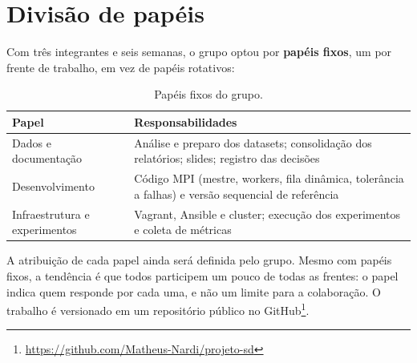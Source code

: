 \section{Divisão de papéis}

Com três integrantes e seis semanas, o grupo optou por \textbf{papéis
fixos}, um por frente de trabalho, em vez de papéis rotativos:

\begin{table}[H]
  \centering
  \small
  \begin{tabularx}{\textwidth}{>{\raggedright}p{3.6cm}X}
    \toprule
    \textbf{Papel} & \textbf{Responsabilidades} \\
    \midrule
    Dados e documentação &
      Análise e preparo dos datasets; consolidação dos relatórios; slides;
      registro das decisões \\
    Desenvolvimento &
      Código MPI (mestre, workers, fila dinâmica, tolerância a falhas) e
      versão sequencial de referência \\
    Infraestrutura e experimentos &
      Vagrant, Ansible e cluster; execução dos experimentos e coleta de
      métricas \\
    \bottomrule
  \end{tabularx}
  \caption{Papéis fixos do grupo.}
\end{table}

A atribuição de cada papel ainda será definida pelo grupo. Mesmo com
papéis fixos, a tendência é que todos participem um pouco de todas as
frentes: o papel indica quem responde por cada uma, e não um limite para a
colaboração. O trabalho é versionado em um repositório público no
GitHub\footnote{\url{https://github.com/Matheus-Nardi/projeto-sd}}.
